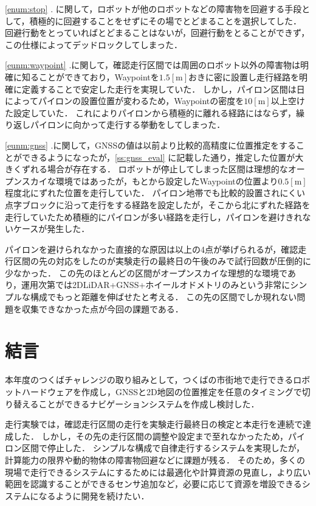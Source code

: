 \documentclass[platex,dvipdfmx]{rbproceedings}
\begin{document}
\ref{enum:stop} . に関して，ロボットが他のロボットなどの障害物を回避する手段として，積極的に回避することをせずにその場でとどまることを選択してした．
回避行動をとっていればとどまることはないが，回避行動をとることができず，この仕様によってデッドロックしてしまった．

\ref{eunm:waypoint} .に関して，確認走行区間では周囲のロボット以外の障害物は明確に知ることができており，Waypointを$1.5[ \mathrm{m}]$おきに密に設置し走行経路を明確に定義することで安定した走行を実現していた．
しかし，パイロン区間は日によってパイロンの設置位置が変わるため，Waypointの密度を$10[ \mathrm{m}]$以上空けた設定していた．
これによりパイロンから積極的に離れる経路にはならず，繰り返しパイロンに向かって走行する挙動をしてしまった．

\ref{eunm:gnss} .に関して，GNSSの値は以前より比較的高精度に位置推定をすることができるようになったが，\ref{ss:gnss_eval} に記載した通り，推定した位置が大きくずれる場合が存在する．
ロボットが停止してしまった区間は理想的なオープンスカイな環境ではあったが，もとから設定したWaypointの位置より$0.5[ \mathrm{m}]$程度北にずれた位置を走行していた．
パイロン地帯でも比較的設置されにくい点字ブロックに沿って走行をする経路を設定したが，そこから北にずれた経路を走行していたため積極的にパイロンが多い経路を走行し，パイロンを避けきれないケースが発生した．

パイロンを避けられなかった直接的な原因は以上の4点が挙げられるが，確認走行区間の先の対応をしたのが実験走行の最終日の午後のみで試行回数が圧倒的に少なかった．
この先のほとんどの区間がオープンスカイな理想的な環境であり，運用次第では2DLiDAR+GNSS+ホイールオドメトリのみという非常にシンプルな構成でもっと距離を伸ばせたと考える．
この先の区間でしか現れない問題を収集できなかった点が今回の課題である．

\section{結言}
本年度のつくばチャレンジの取り組みとして，つくばの市街地で走行できるロボットハードウェアを作成し，GNSSと2D地図の位置推定を任意のタイミングで切り替えることができるナビゲーションシステムを作成し検討した．

走行実験では，確認走行区間の走行を実験走行最終日の検定と本走行を連続で達成した．
しかし，その先の走行区間の調整や設定まで至れなかったため，パイロン区間で停止した．
シンプルな構成で自律走行するシステムを実現したが，計算能力の限界や動的物体の障害物回避などに課題が残る．
そのため，多くの現場で走行できるシステムにするためには最適化や計算資源の見直し，より広い範囲を認識することができるセンサ追加など，必要に応じて資源を増設できるシステムになるように開発を続けたい．
\end{document}
